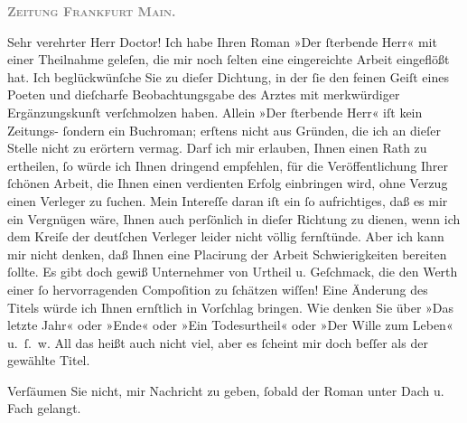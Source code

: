 \pstart
           \textcolor{gray}{\textbf{\textsc{Zeitung Frankfurt Main.}}}\pend
           
\pstart{}Sehr verehrter Herr Doctor!\pend\vspace{0.5em}
\pstart
           Ich habe Ihren Roman »Der{ }ſterbende Herr« mit
               einer Theilnahme geleſen, die mir noch{ }ſelten eine eingereichte Arbeit eingeflößt
               hat. Ich beglückwünſche Sie zu dieſer Dichtung, in der{ }ſie den feinen
               Geiſt eines Poeten und \introOben{}die\introOben{}{ }ſcharfe Beobachtungsgabe des Arztes mit
               merkwürdiger Ergänzungskunſt verſchmolzen haben. Allein »Der{ }ſterbende Herr« iſt kein Zeitungs-{ }ſondern ein Buchroman;
               erſtens nicht aus Gründen, die ich an dieſer Stelle nicht zu erörtern vermag. Darf
               ich mir erlauben, Ihnen einen Rath zu ertheilen,{ }ſo würde ich Ihnen dringend
               empfehlen, für die Veröffentlichung Ihrer{ }ſchönen Arbeit, die Ihnen einen verdienten
               Erfolg einbringen wird, ohne Verzug einen Verleger zu{ }ſuchen. Mein Intereſſe daran
               iſt ein{ }ſo aufrichtiges, daß es mir ein Vergnügen wäre, Ihnen auch perſönlich in
               dieſer Richtung zu dienen, wenn ich dem Kreiſe der deutſchen Verleger leider nicht
               völlig fernſtünde. Aber ich kann mir nicht denken, daß Ihnen eine Placirung der
               Arbeit Schwierigkeiten bereiten{ }ſollte. Es gibt doch gewiß Unternehmer von Urtheil u.
               Geſchmack, die den Werth einer{ }ſo hervorragenden Compoſition zu{ }ſchätzen wiſſen! Eine
               Änderung des Titels würde ich Ihnen ernſtlich {\pb}in Vorſchlag bringen. Wie denken Sie über
               »Das letzte Jahr« oder »Ende« oder »Ein Todesurtheil« oder »Der Wille zum Leben«
               u. ſ. w. All das heißt auch nicht viel, aber es{ }ſcheint mir doch beſſer als der
               gewählte Titel.\pend
           
\pstart
           Verſäumen Sie nicht, mir Nachricht zu geben,{ }ſobald der Roman unter Dach u. Fach gelangt.\pend
           
